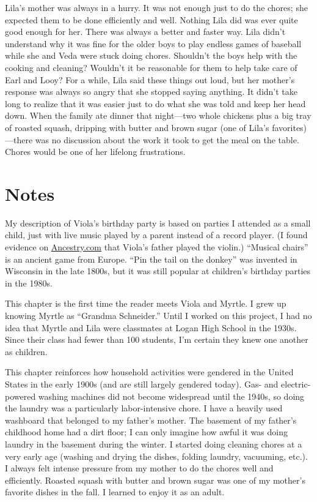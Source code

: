 \documentclass[
  american,
  letterpaper,
]{book}
\begin{document}
Lila's mother was always in a hurry. It was not enough just to do the
chores; she expected them to be done efficiently and well. Nothing Lila
did was ever quite good enough for her. There was always a better and
faster way. Lila didn't understand why it was fine for the older boys to
play endless games of baseball while she and Veda were stuck doing
chores. Shouldn't the boys help with the cooking and cleaning? Wouldn't
it be reasonable for them to help take care of Earl and Looy? For a
while, Lila said these things out loud, but her mother's response was
always so angry that she stopped saying anything. It didn't take long to
realize that it was easier just to do what she was told and keep her
head down. When the family ate dinner that night---two whole chickens
plus a big tray of roasted squash, dripping with butter and brown sugar
(one of Lila's favorites)---there was no discussion about the work it
took to get the meal on the table. Chores would be one of her lifelong
frustrations.

\section{Notes}\label{notes-8}

My description of Viola's birthday party is based on parties I attended
as a small child, just with live music played by a parent instead of a
record player. (I found evidence on
\href{https://www.ancestry.com/}{Ancestry.com} that Viola's father
played the violin.) ``Musical chairs'' is an ancient game from Europe.
``Pin the tail on the donkey'' was invented in Wisconsin in the late
1800s, but it was still popular at children's birthday parties in the
1980s.

This chapter is the first time the reader meets Viola and Myrtle. I grew
up knowing Myrtle as ``Grandma Schneider.'' Until I worked on this
project, I had no idea that Myrtle and Lila were classmates at Logan
High School in the 1930s. Since their class had fewer than 100 students,
I'm certain they knew one another as children.

This chapter reinforces how household activities were gendered in the
United States in the early 1900s (and are still largely gendered today).
Gas- and electric-powered washing machines did not become widespread
until the 1940s, so doing the laundry was a particularly labor-intensive
chore. I have a heavily used washboard that belonged to my father's
mother. The basement of my father's childhood home had a dirt floor; I
can only imagine how awful it was doing laundry in the basement during
the winter. I started doing cleaning chores at a very early age (washing
and drying the dishes, folding laundry, vacuuming, etc.). I always felt
intense pressure from my mother to do the chores well and efficiently.
Roasted squash with butter and brown sugar was one of my mother's
favorite dishes in the fall. I learned to enjoy it as an adult.
\end{document}

